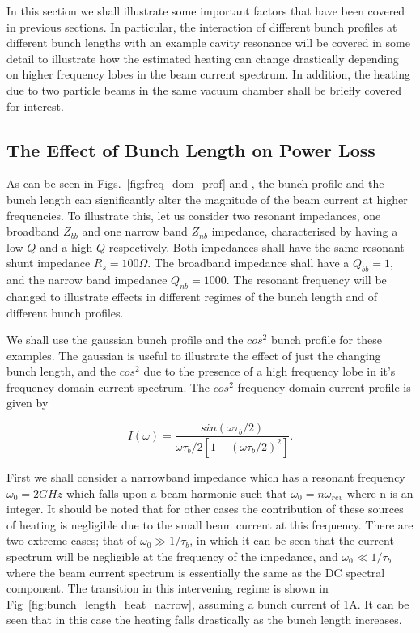 In this section we shall illustrate some important factors that have been covered in previous sections. In particular, the interaction of different bunch profiles at different bunch lengths with an example cavity resonance will be covered in some detail to illustrate how the estimated heating can change drastically depending on higher frequency lobes in the beam current spectrum. In addition, the heating due to two particle beams in the same vacuum chamber shall be briefly covered for interest.

\subsection{The Effect of Bunch Length on Power Loss}

As can be seen in Figs.~\ref{fig:freq_dom_prof} and \label{fig:diff_bunch_len_para}, the bunch profile and the bunch length can significantly alter the magnitude of the beam current at higher frequencies. To illustrate this, let us consider two resonant impedances, one broadband $Z_{bb}$ and one narrow band $Z_{nb}$ impedance, characterised by having a low-$Q$ and a high-$Q$ respectively. Both impedances shall have the same resonant shunt impedance $R_{s} = 100\Omega$. The broadband impedance shall have a $Q_{bb}=1$, and the narrow band impedance $Q_{nb}=1000$. The resonant frequency will be changed to illustrate effects in different regimes of the bunch length and of different bunch profiles.

We shall use the gaussian bunch profile and the $cos^{2}$ bunch profile for these examples. The gaussian is useful to illustrate the effect of just the changing bunch length, and the $cos^{2}$ due to the presence of a high frequency lobe in it's frequency domain current spectrum. The $cos^{2}$ frequency domain current profile is given by

\begin{equation}
I \left( \omega \right) = \frac{sin \left( \omega \tau_{b}/2 \right)}{ \omega \tau_{b}/2 \left[ 1 - \left(  \omega \tau_{b}/2 \right)^{2}  \right]}.
\end{equation}

First we shall consider a narrowband impedance which has a resonant frequency $\omega_{0} =2GHz$ which falls upon a beam harmonic such that $\omega_{0}=n\omega_{rev}$ where n is an integer. It should be noted that for other cases the contribution of these sources of heating is negligible due to the small beam current at this frequency. There are two extreme cases; that of  $\omega_{0} \gg 1/\tau_{b}$, in which it can be seen that the current spectrum will be negligible at the frequency of the impedance, and $\omega_{0} \ll 1/\tau_{b}$ where the beam current spectrum is essentially the same as the DC spectral component. The transition in this intervening regime is shown in Fig~\ref{fig:bunch_length_heat_narrow}, assuming a bunch current of 1A. It can be seen that in this case the heating falls drastically as the bunch length increases.

